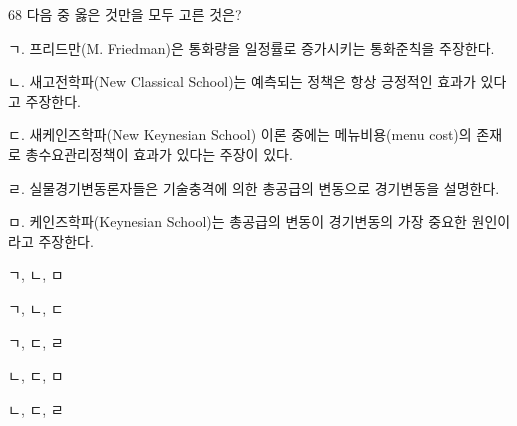 \begin{question}{68}
다음 중 옳은 것만을 모두 고른 것은?
\begin{framedtext}
ㄱ. 프리드만(M. Friedman)은 통화량을 일정률로 증가시키는 통화준칙을 주장한다. \par
ㄴ. 새고전학파(New Classical School)는 예측되는 정책은 항상 긍정적인 효과가 있다고 주장한다. \par
ㄷ. 새케인즈학파(New Keynesian School) 이론 중에는 메뉴비용(menu cost)의 존재로 총수요관리정책이 효과가 있다는 주장이 있다. \par
ㄹ. 실물경기변동론자들은 기술충격에 의한 총공급의 변동으로 경기변동을 설명한다. \par
ㅁ. 케인즈학파(Keynesian School)는 총공급의 변동이 경기변동의 가장 중요한 원인이라고 주장한다.
\end{framedtext}
\begin{choices}
  \item ㄱ, ㄴ, ㅁ
  \item ㄱ, ㄴ, ㄷ
  \item ㄱ, ㄷ, ㄹ
  \item ㄴ, ㄷ, ㅁ
  \item ㄴ, ㄷ, ㄹ
\end{choices}
\end{question}
